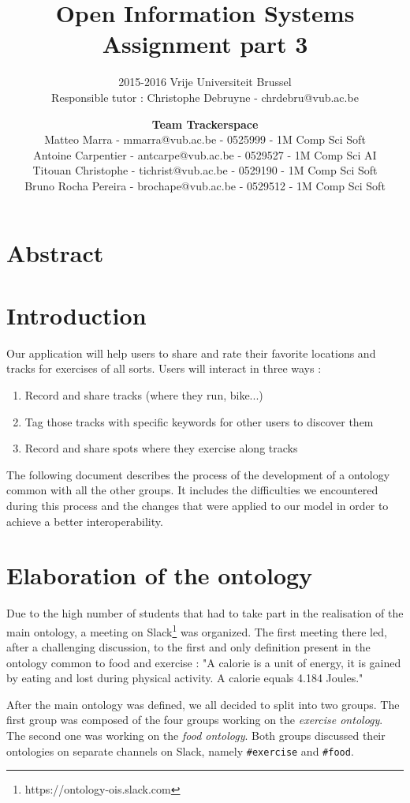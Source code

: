 \documentclass[a4paper]{article}
\title{\textbf{Open Information Systems\\Assignment part 3}}
\subtitle{2015-2016 Vrije Universiteit Brussel\\Responsible tutor : Christophe Debruyne - chrdebru@vub.ac.be}
\author{\textbf{Team Trackerspace}\\Matteo Marra - mmarra@vub.ac.be - 0525999 - 1M Comp Sci Soft\\Antoine Carpentier - antcarpe@vub.ac.be - 0529527 - 1M Comp Sci AI\\Titouan Christophe - tichrist@vub.ac.be - 0529190 - 1M Comp Sci Soft\\Bruno Rocha Pereira - brochape@vub.ac.be - 0529512 - 1M Comp Sci Soft}
\begin{document}
\maketitle

\section{Abstract}
\section{Introduction}

Our application will help users to share and rate their favorite locations and tracks for exercises of all sorts. Users will interact in three ways : 

\begin{enumerate}
    \item Record and share tracks (where they run, bike...)
    \item Tag those tracks with specific keywords for other users to discover them
    \item Record and share spots where they exercise along tracks
\end{enumerate}

The following document describes the process of the development of a ontology common with all the other groups. It includes the difficulties we encountered during this process and the changes that were applied to our model in order to achieve a better interoperability.




\section{Elaboration of the ontology}
Due to the high number of students that had to take part in the realisation of the main ontology, a meeting on Slack\footnote{https://ontology-ois.slack.com} was organized. The first meeting there led, after a challenging discussion, to the first and only definition present in the ontology common to food and exercise : "A calorie is a unit of energy, it is gained by eating and lost during physical activity. A calorie equals 4.184 Joules." 

After the main ontology was defined, we all decided to split into two groups. The first group was composed of the four groups working on the \textit{exercise ontology}. The second one was working on the \textit{food ontology}. Both groups discussed their ontologies on separate channels on Slack, namely \texttt{\#exercise} and \texttt{\#food}.
\end{document}

